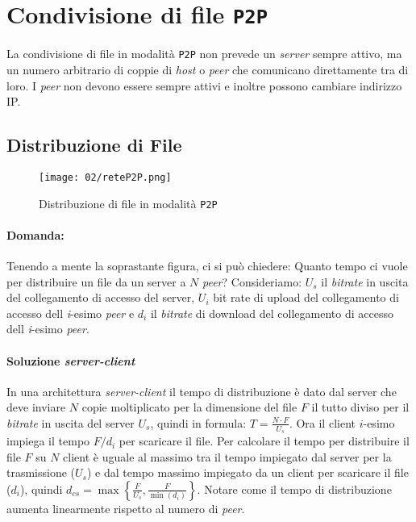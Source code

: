 \section{Condivisione di file \texttt{P2P}}
    La condivisione di file in modalità \texttt{P2P} non prevede un \textit{server} sempre attivo, ma un numero arbitrario di coppie di \textit{host} o \textit{peer} che comunicano direttamente tra di loro. I \textit{peer} non devono essere sempre attivi e inoltre possono cambiare indirizzo IP.
    \subsection{Distribuzione di File}
        \begin{figure}[H]
            \centering
            \texttt{[image: 02/reteP2P.png]}
            \caption{Distribuzione di file in modalità \texttt{P2P}}
        \end{figure}
        \paragraph{Domanda:} Tenendo a mente la soprastante figura, ci si può chiedere: Quanto tempo ci vuole per distribuire un file da un server a $ N $ \textit{peer}?\newline
        Consideriamo: \textbf{$U_s$} il \textit{bitrate} in uscita del collegamento di accesso del server, \textbf{$U_i$} bit rate di upload del collegamento di accesso dell \textit{i}-esimo \textit{peer} e \textit{$d_i$} il \textit{bitrate} di download del collegamento di accesso dell \textit{i}-esimo \textit{peer}.
        \paragraph{Soluzione \textit{server-client}} In una architettura \textit{server-client} il tempo di distribuzione è dato dal server che deve inviare $N$ copie moltiplicato per la dimensione del file $F$ il tutto diviso per il \textit{bitrate} in uscita del server $U_s$, quindi in formula: $T=\frac{N\cdot F}{U_s}$. Ora il client $i$-esimo impiega il tempo $F/d_i$ per scaricare il file. Per calcolare il tempo per distribuire il file $F$ su $N$ client è uguale al massimo tra il tempo impiegato dal server per la trasmissione ($U_s$) e dal tempo massimo impiegato da un client per scaricare il file ($d_i$), quindi $d_{cs} = \max\left\{\frac{F}{U_s}, \frac{F}{\min(d_i)}\right\}$. Notare come il tempo di distribuzione aumenta linearmente rispetto al numero di \textit{peer}.
